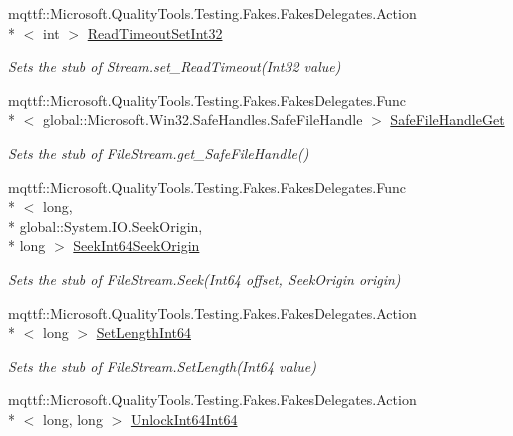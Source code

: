 \begin{DoxyCompactItemize}
mqttf\-::\-Microsoft.\-Quality\-Tools.\-Testing.\-Fakes.\-Fakes\-Delegates.\-Action\\*
$<$ int $>$ \hyperlink{class_system_1_1_i_o_1_1_fakes_1_1_stub_file_stream_a39f07d7ff5cfe42b9f9691ef1e5d9c7d}{Read\-Timeout\-Set\-Int32}
\begin{DoxyCompactList}\small\item\em Sets the stub of Stream.\-set\-\_\-\-Read\-Timeout(\-Int32 value)\end{DoxyCompactList}\item 
mqttf\-::\-Microsoft.\-Quality\-Tools.\-Testing.\-Fakes.\-Fakes\-Delegates.\-Func\\*
$<$ global\-::\-Microsoft.\-Win32.\-Safe\-Handles.\-Safe\-File\-Handle $>$ \hyperlink{class_system_1_1_i_o_1_1_fakes_1_1_stub_file_stream_aecd9cad5f5f536e5dfd217195d82458e}{Safe\-File\-Handle\-Get}
\begin{DoxyCompactList}\small\item\em Sets the stub of File\-Stream.\-get\-\_\-\-Safe\-File\-Handle()\end{DoxyCompactList}\item 
mqttf\-::\-Microsoft.\-Quality\-Tools.\-Testing.\-Fakes.\-Fakes\-Delegates.\-Func\\*
$<$ long, \\*
global\-::\-System.\-I\-O.\-Seek\-Origin, \\*
long $>$ \hyperlink{class_system_1_1_i_o_1_1_fakes_1_1_stub_file_stream_a4b714310ba4cbe1d61531250d43da8f9}{Seek\-Int64\-Seek\-Origin}
\begin{DoxyCompactList}\small\item\em Sets the stub of File\-Stream.\-Seek(\-Int64 offset, Seek\-Origin origin)\end{DoxyCompactList}\item 
mqttf\-::\-Microsoft.\-Quality\-Tools.\-Testing.\-Fakes.\-Fakes\-Delegates.\-Action\\*
$<$ long $>$ \hyperlink{class_system_1_1_i_o_1_1_fakes_1_1_stub_file_stream_ab5aedf531bb00b3dbda2b7197b64d04a}{Set\-Length\-Int64}
\begin{DoxyCompactList}\small\item\em Sets the stub of File\-Stream.\-Set\-Length(\-Int64 value)\end{DoxyCompactList}\item 
mqttf\-::\-Microsoft.\-Quality\-Tools.\-Testing.\-Fakes.\-Fakes\-Delegates.\-Action\\*
$<$ long, long $>$ \hyperlink{class_system_1_1_i_o_1_1_fakes_1_1_stub_file_stream_a717ff9b007ba605adcfae5e93e8df4d8}{Unlock\-Int64\-Int64}

\end{DoxyCompactItemize}
